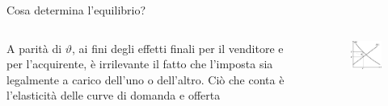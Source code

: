 \documentclass[aspectratio=64,11pt]{beamer}
\begin{document}
\begin{frame}{Cosa determina l'equilibrio?}
\begin{columns}
\begin{column}{.45\columnwidth}
A parità di $\vartheta$, ai fini degli effetti finali per il venditore e per
l'acquirente, è irrilevante il fatto che l'imposta sia legalmente a carico
dell'uno o dell'altro.  Ciò che conta è l'elasticità delle curve di domanda e
offerta
\end{column}

\begin{column}{.5\columnwidth}
\begin{figure}[htbp]
\centering
\includegraphics[width=\linewidth]{./figure/incidenza-4.pdf}
\end{figure}
\end{column}
\end{columns}
\end{frame}
\end{document}
